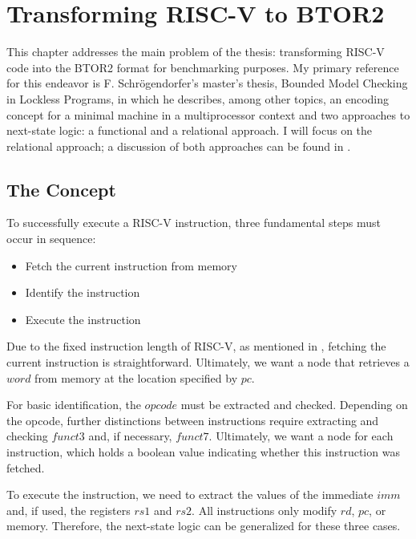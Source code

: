 \chapter{Transforming RISC-V to BTOR2}\label{chap:riscv_to_btor2}


This chapter addresses the main problem of the thesis: transforming RISC-V code
into the BTOR2 format for benchmarking purposes. My primary reference for this
endeavor is F. Schrögendorfer's master's thesis, \dq Bounded Model Checking in
Lockless Programs\dq \cite{bmcOfLockless}, in which he describes, among other
topics, an encoding concept for a minimal machine in a multiprocessor context
\cite[Chapter 2]{bmcOfLockless} and two approaches to next-state logic: a
functional \cite[Chapter 6]{bmcOfLockless} and a relational \cite[Chapter
    7]{bmcOfLockless} approach. I will focus on the relational approach; a
discussion of both approaches can be found in .

\section{The Concept}
To successfully execute a RISC-V instruction, three fundamental steps must
occur in sequence:
\begin{itemize}
    \item Fetch the current instruction from memory
    \item Identify the instruction
    \item Execute the instruction
\end{itemize}
Due to the fixed instruction length of RISC-V, as mentioned in
, fetching the current instruction is straightforward.
Ultimately, we want a node that retrieves a $word$ from memory at the location
specified by $pc$.

For basic identification, the $opcode$ must be extracted and checked. Depending
on the opcode, further distinctions between instructions require extracting and
checking $funct3$ and, if necessary, $funct7$. Ultimately, we want a node for
each instruction, which holds a boolean value indicating whether this
instruction was fetched.

To execute the instruction, we need to extract the values of the immediate
$imm$ and, if used, the registers $rs1$ and $rs2$. All instructions only modify
$rd$, $pc$, or memory. Therefore, the next-state logic can be generalized for
these three cases.

